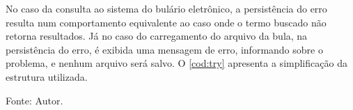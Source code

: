 No caso da consulta ao sistema do bulário eletrônico, a persistência do erro resulta num comportamento equivalente ao caso onde o termo buscado não retorna resultados.
Já no caso do carregamento do arquivo da bula, na persistência do erro, é exibida uma mensagem de erro, informando sobre o problema, e nenhum arquivo será salvo.
O \autoref{cod:try} apresenta a simplificação da estrutura utilizada.


\begin{lstfloat}[htbp]
    \centering
    
    \caption*{Fonte: Autor.}
\end{lstfloat}
